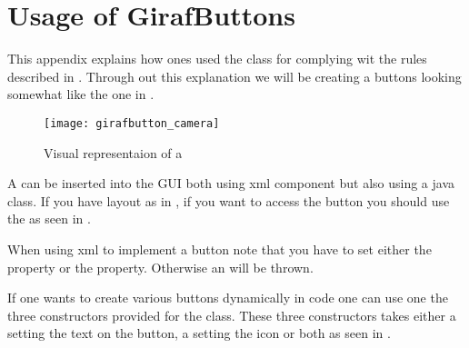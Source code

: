 \chapter{Usage of GirafButtons}
\label{app:usage_of_girafbuttons}

This appendix explains how ones used the class  for complying wit the rules described in . Through out this explanation we will be creating a buttons looking somewhat like the one in .

\begin{figure}[h]
	\centering
	\texttt{[image: girafbutton\_camera]}
	\caption{Visual representaion of a }
	\label{fig:girafbutton_camera}
\end{figure}
\noindent



\noindent
A  can be inserted into the GUI both using xml component but also using a java class. If you have layout as in , if you want to access the button you should use the  as seen in .

\begin{note}
	When using xml to implement a button note that you have to set either the  property or the  property. Otherwise an  will be thrown.
\end{note}


\noindent
If one wants to create various buttons dynamically in code one can use one the three constructors provided for the  class. These three constructors takes either a  setting the text on the button, a  setting the icon or both as seen in .